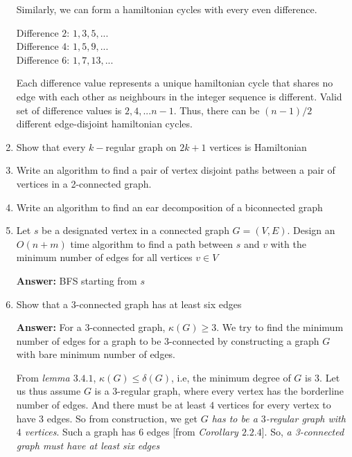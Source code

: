 \begin{enumerate}
{        Similarly, we can form a hamiltonian cycles with every even difference.
        
        Difference $2$: $1, 3, 5, ...$ \\
        Difference $4$: $1, 5, 9, ...$ \\
        Difference $6$: $1, 7, 13, ...$
        
        Each difference value represents a unique hamiltonian cycle that shares no edge with each other as neighbours in the integer sequence is different. Valid set of difference values is ${2, 4, ... n-1}$. Thus, there can be $(n-1)/2$ different edge-disjoint hamiltonian cycles.
    }
    \item {
        Show that every $k-$regular graph on $2k+1$ vertices is Hamiltonian
    }
    \item {
        Write an algorithm to find a pair of vertex disjoint paths between a pair of vertices in a 2-connected graph.
    }
    \item {
        Write an algorithm to find an ear decomposition of a biconnected graph
    }
    \item {
        Let $s$ be a designated vertex in a connected graph $G = (V, E)$. Design an $O(n+m)$ time algorithm to find a path between $s$ and $v$ with the minimum number of edges for all vertices $v \in V$
        
        \textbf{Answer: } BFS starting from $s$
    }
    \item {
        Show that a 3-connected graph has at least six edges
        
        \textbf{Answer:} For a $3$-connected graph, $\kappa(G) \ge 3$. We try to find the minimum number of edges for a graph to be $3$-connected by constructing a graph $G$ with bare minimum number of edges.
        
        From \textit{lemma $3.4.1$}, \textit{$\kappa(G) \leq \delta(G)$}, i.e, the minimum degree of $G$ is 3. Let us thus assume $G$ is a $3$-regular graph, where every vertex has the borderline number of edges. And there must be at least $4$ vertices for every vertex to have $3$ edges. So from construction, we get \textit{$G$ has to be a $3$-regular graph with $4$ vertices}. Such a graph has $6$ edges %
        [from \textit{Corollary $2.2.4$}].
        So, \textit{a 3-connected graph must have at least six edges}
        
}
\end{enumerate}
